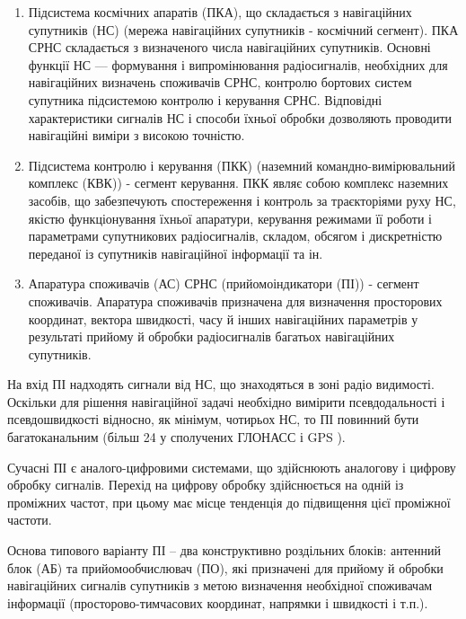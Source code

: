 \begin{enumerate}
\item Підсистема космічних апаратів (ПКА), що складається з навігаційних супутників (НС)
(мережа навігаційних супутників - космічний сегмент). ПКА СРНС складається з визначеного 
числа навігаційних супутників. Основні функції НС --- формування і випромінювання 
радіосигналів, необхідних для навігаційних визначень споживачів СРНС, контролю бортових 
систем супутника підсистемою контролю і керування СРНС. Відповідні характеристики сигналів 
НС і способи їхньої обробки дозволяють проводити навігаційні виміри з високою точністю.
 \item Підсистема контролю і керування (ПКК) (наземний командно-вимірювальний комплекс (КВК)) - 
сегмент керування. ПКК являє собою комплекс наземних засобів, що забезпечують 
спостереження і контроль за траєкторіями руху НС, якістю функціонування їхньої апаратури, 
керування режимами її роботи і параметрами супутникових радіосигналів, складом, обсягом і 
дискретністю переданої із супутників навігаційної інформації та ін.
\item Апаратура споживачів (АС) СРНС (прийомоіндикатори (ПІ)) - сегмент споживачів.
Апаратура споживачів призначена для визначення просторових координат, вектора швидкості, 
часу й інших навігаційних параметрів у результаті прийому й обробки радіосигналів багатьох 
навігаційних супутників.
\end{enumerate}

На вхід ПІ надходять сигнали від НС, що знаходяться в зоні радіо видимості. Оскільки для 
рішення навігаційної задачі необхідно вимірити псевдодальності і псевдошвидкості відносно, 
як мінімум, чотирьох НС, то ПІ повинний бути багатоканальним (більш 24 у сполучених ГЛОНАСС і GPS ).

Сучасні ПІ є аналого-цифровими системами, що здійснюють аналогову і цифрову обробку 
сигналів. Перехід на цифрову обробку здійснюється на одній із проміжних частот, при 
цьому має місце тенденція до підвищення цієї проміжної частоти.

Основа типового варіанту ПІ -- два конструктивно роздільних блоків: антенний блок (АБ) та 
прийомообчислювач (ПО), які призначені для прийому й обробки навігаційних сигналів 
супутників з метою визначення необхідної споживачам інформації (просторово-тимчасових 
координат, напрямки і швидкості і т.п.).

